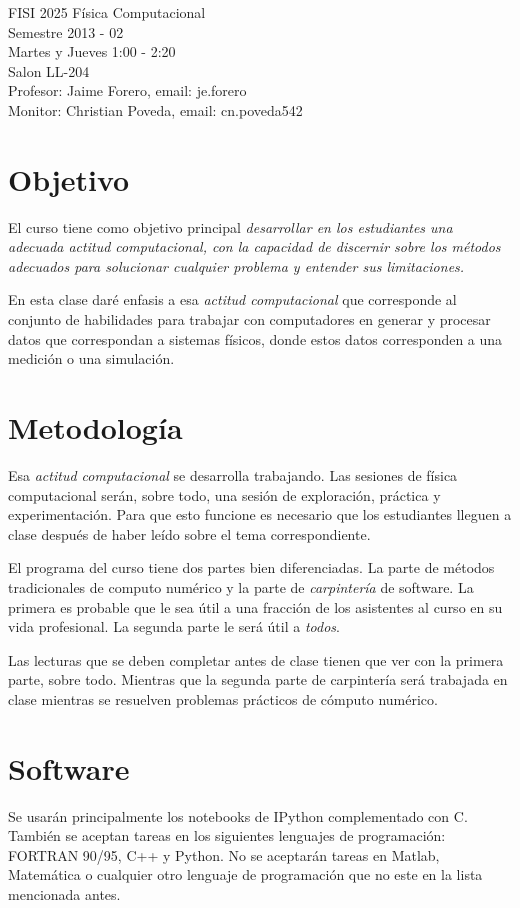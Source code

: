 \documentclass[12pt]{article}
\begin{document}
\noindent
FISI 2025 F\'isica Computacional \\
Semestre 2013 - 02\\
Martes y Jueves 1:00 - 2:20 \\
Salon LL-204\\
Profesor: Jaime Forero, email: je.forero\\
Monitor: Christian Poveda, email: cn.poveda542\\

\section*{Objetivo}
El curso tiene como objetivo principal \emph{desarrollar en los
  estudiantes una adecuada actitud computacional, con la capacidad de
  discernir sobre los m\'etodos adecuados para solucionar cualquier
  problema y entender sus limitaciones.} 
 
En esta clase dar\'e enfasis a esa \emph{actitud computacional} que
corresponde al conjunto de habilidades para trabajar con computadores
en generar y procesar datos que correspondan a sistemas f\'isicos,
donde estos datos corresponden a una medici\'on o una simulaci\'on. 

\section*{Metodolog\'ia}
Esa \emph{actitud computacional} se desarrolla trabajando. Las
sesiones de f\'isica computacional ser\'an, sobre todo, una sesi\'on
de exploraci\'on, pr\'actica y experimentaci\'on. Para que esto
funcione es necesario que los estudiantes lleguen a clase despu\'es de
haber le\'ido sobre el tema correspondiente. 

El programa del curso tiene dos partes bien diferenciadas. La parte de
m\'etodos tradicionales de computo num\'erico y la parte de
\emph{carpinter\'ia} de software. La primera es probable que le sea
\'util a una fracci\'on de los asistentes al curso en su vida
profesional. La segunda parte le ser\'a \'util a \emph{todos}. 

Las lecturas que se deben completar antes de clase tienen que ver con
la primera parte, sobre todo. Mientras que la segunda parte de
carpinter\'ia ser\'a trabajada en clase mientras se resuelven
problemas pr\'acticos de c\'omputo num\'erico. 

\section*{Software}
\noindent Se usar\'an principalmente los notebooks de IPython
complementado con C. Tambi\'en se aceptan tareas en los siguientes
lenguajes de programaci\'on: FORTRAN 90/95, C++ y Python. No se
aceptar\'an tareas en Matlab, Matem\'atica o cualquier otro lenguaje
de programaci\'on que no este en la lista mencionada antes.  
\end{document}
